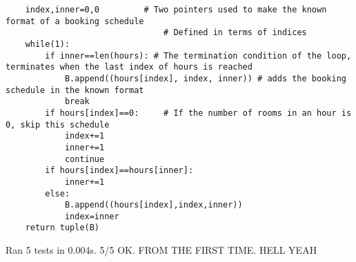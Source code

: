 \documentclass[12pt,twoside]{article}
\begin{document}
\begin{problems}
\begin{problemparts}
\begin{lstlisting}
    index,inner=0,0         # Two pointers used to make the known format of a booking schedule
    						    # Defined in terms of indices
    while(1):
        if inner==len(hours): # The termination condition of the loop, terminates when the last index of hours is reached
            B.append((hours[index], index, inner)) # adds the booking schedule in the known format
            break
        if hours[index]==0:		# If the number of rooms in an hour is 0, skip this schedule
            index+=1
            inner+=1
            continue
        if hours[index]==hours[inner]:
            inner+=1
        else:
            B.append((hours[index],index,inner))
            index=inner
    return tuple(B)
\end{lstlisting}
Ran 5 tests in 0.004s. 5/5 OK.
FROM THE FIRST TIME. HELL YEAH
\end{problemparts}

\end{problems}
\end{document}

